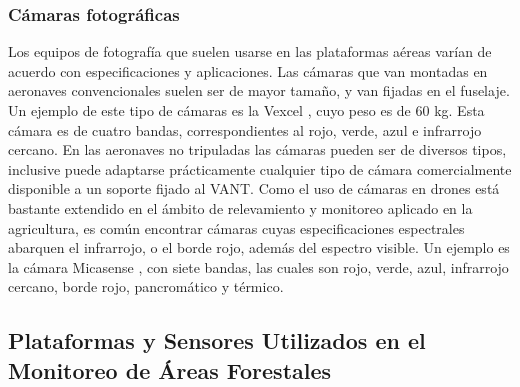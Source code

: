 \subsubsection{Cámaras fotográficas}
Los equipos de fotografía que suelen usarse en las plataformas aéreas varían de acuerdo con especificaciones y aplicaciones. Las cámaras que van montadas en aeronaves convencionales suelen ser de mayor tamaño, y van fijadas en el fuselaje. Un ejemplo de este tipo de cámaras es la Vexcel \cite{noauthor_ultracam_nodate}, cuyo peso es de 60 kg. Esta cámara es de cuatro bandas, correspondientes al rojo, verde, azul e infrarrojo cercano. En las aeronaves no tripuladas las cámaras pueden ser de diversos tipos, inclusive puede adaptarse prácticamente cualquier tipo de cámara comercialmente disponible a un soporte fijado al VANT. Como el uso de cámaras en drones está bastante extendido en el ámbito de relevamiento y monitoreo aplicado en la agricultura, es común encontrar cámaras cuyas especificaciones espectrales abarquen el infrarrojo, o el borde rojo, además del espectro visible. Un ejemplo es la cámara Micasense \cite{noauthor_altum-pt_2023}, con siete bandas, las cuales son rojo, verde, azul, infrarrojo cercano, borde rojo, pancromático y térmico.
 
\subsection{Plataformas y Sensores Utilizados en el Monitoreo de Áreas Forestales}

